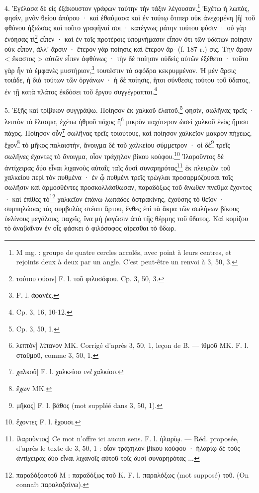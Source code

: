 \documentclass[landscape, a4paper, 11pt, oneside, polutonikogreek, french]{article}
\begin{document}
4. Ἐγέλασα δὲ εἰς ἐξάκουστον γράφων ταύτην τὴν τάξιν λέγουσαν.\footnote{M mg. : groupe de quatre cercles accolés, avec point à leurs centres, et rejoints deux à deux par un angle. C'est peut-être un renvoi à 3, 50, 3.} Ἐχέτω ἡ λωπὰς, φησὶν, μνᾶν θείου ἀπύρου · καὶ ἐθαύμασα καὶ ἐν τούτῳ ὅτιπερ οὐκ ἀνεχομένη [ἢ] τοῦ φθόνου ἠξιώσας καὶ τοῦτο γραφῆναί σοι · κατέγνως μάτην τούτου φύσιν · οὐ γὰρ ἐνόησας τί\footnote{τούτου φύσιν] F. l. τοῦ φιλοσόφου. Cp. 3, 50, 3.} εἶπεν · καὶ ἐν τοῖς προτέροις ὑπομνήμασιν εἶπον ὅτι τῶν ὑδάτων ποίησιν οὐκ εἶπον, ἀλλ' ἄρσιν · ἕτερον γὰρ ποίησις καὶ ἕτερον ἄρ- (f. 187 r.) σις. Τὴν ἄρσιν < ἕκαστος > αὐτῶν εἶπεν ἀφθόνως · τὴν δὲ ποίησιν οὐδεὶς αὐτῶν ἐξέθετο · τοῦτο γὰρ ἦν τὸ ἐμφανὲς μυστήριον,\footnote{F. l. ἀφανὲς.} τουτέστιν τὸ σφόδρα κεκρυμμένον. Ἡ μὲν ἄρσις τοιάδε, ἡ διὰ τούτων τῶν ὀργάνων · ἡ δὲ ποίησις, ἤτοι σύνθεσις τούτου τοῦ ὕδατος, ἐν τῇ κατὰ πλάτος ἐκδόσει τοῦ ἔργου συγγέγραπται.\footnote{Cp. 3, 16, 10-12.}

5. Ἑξῆς καὶ τρίβικον συγγράψω. Ποίησον ἐκ χαλκοῦ ἐλατοῦ,\footnote{Cp. 3, 50, 1.} φησὶν, σωλῆνας τρεῖς · λεπτὸν τὸ ἔλασμα, ἐχέτω ἠθμοῦ πάχος ἢ\footnote{λεπτὸν] λίπανον MK. Corrigé d'après 3, 50, 1, leçon de B. --- ἰθμοῦ MK. F. l. σταθμοῦ, comme 3, 50, 1.} μικρὸν παχύτερον ὡσεὶ χαλκοῦ ἑνὸς ἥμισυ πάχος. Ποίησον οὖν\footnote{χαλκοῦ] F. l. χαλκείου \emph{vel} χαλκίου.} σωλῆνας τρεῖς τοιούτους, καὶ ποίησον χαλκεῖον μακρὸν πήχεως, ἔχον\footnote{ἔχων MK.} τὸ μῆκος παλαιστὴν, ἄνοιγμα δὲ τοῦ χαλκείου σύμμετρον · οἱ δὲ\footnote{μῆκος] F. l. βάθος (mot suppléé dans 3, 50, 1).} τρεῖς σωλῆνες ἔχοντες τὸ ἄνοιγμα, οἷον τράχηλον βίκου κούφου.\footnote{ἔχοντες F. l. ἔχουσι.} Ἱλαροῦντος δὲ ἀντίχειρας δύο εἶναι λιχανοὺς αὐταῖς ταῖς δυσὶ συναρηρότας\footnote{ἱλαροῦντος] Ce mot n'offre ici aucun sens. F. l. ἡλαρίῳ. --- Réd. proposée, d'après le texte de 3, 50, 1 : οἷον τράχηλον βίκου κούφου · ἡλαρίῳ δὲ τοὺς ἀντίχειρας δύο εἶναι λιχανοῖς αὐτοῦ τοῖς δυσὶ συναρηρότας ...} ἐκ πλευρῶν τοῦ χαλκείου περὶ τὸν πυθμένα · ἐν ᾧ πυθμένι τρεῖς τρώγλαι προσαρμόζουσαι τοῖς σωλῆσιν καὶ ἁρμοσθέντες προσκολλάσθωσαν, παραδόξως τοῦ ἄνωθεν πνεῦμα ἔχοντος · καὶ ἐπίθες τὸ\footnote{παραδόξοστοῦ M : παραδόξως τοῦ K. F. l. παραλόξως (mot supposé) τοῦ. (On connaît παραλοξαίνω).} χαλκεῖον ἐπάνω λωπάδος ὀστρακίνης, ἐχούσης τὸ θεῖον · συμπηλώσας τὰς συμβολὰς στέατι ἄρτου, ἔνθες ἐπὶ τὰ ἄκρα τῶν σωλήνων βίκους ὑελίνους μεγάλους, παχεῖς, ἵνα μὴ ῥαγῶσιν ἀπὸ τῆς θέρμης τοῦ ὕδατος. Καὶ κομίζου τὸ ἀναβαῖνον ἐν οἷς φάσκει ὁ φιλόσοφος αἴρεσθαι τὸ ὕδωρ.
\end{document}
